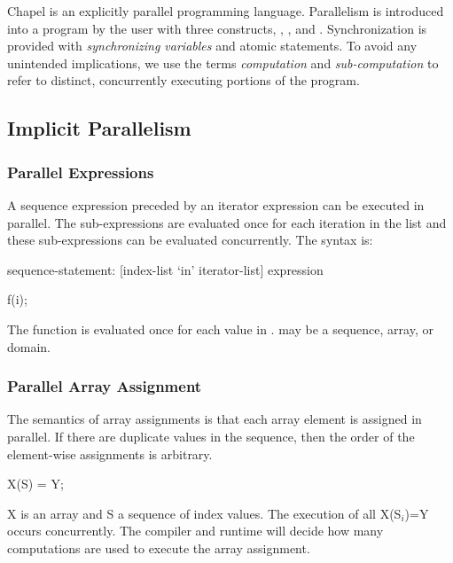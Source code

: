 \label{Parallelism_and_Synchronization}

Chapel is an explicitly parallel programming language. Parallelism is
introduced into a program by the user with three constructs,
, , and .  Synchronization is
provided with \emph{synchronizing variables} and atomic statements. To
avoid any unintended implications, we use the terms \emph{computation}
and \emph{sub-computation} to refer to distinct, concurrently
executing portions of the program.


\subsection{Implicit Parallelism}
\label{Implicit_Parallelism}


\subsubsection{Parallel Expressions}
\label{Parallel_Expressions}

A sequence expression preceded by an iterator expression can be
executed in parallel. The sub-expressions are evaluated once for each
iteration in the list and these sub-expressions can be evaluated
concurrently. The syntax is:
\begin{syntax}
sequence-statement:
   [index-list `in' iterator-list] expression
\end{syntax}

\begin{example}
\begin{chapel}
[i in S] f(i);
\end{chapel}
The function  is evaluated once for each value in . 
may be a sequence, array, or domain.
\end{example}

\subsubsection{Parallel Array Assignment}
\label{Parallel_Array_Assignment}

The semantics of array assignments is that each array element is
assigned in parallel. If there are duplicate values in the sequence,
then the order of the element-wise assignments is arbitrary.

\begin{example}
\begin{chapel}
X(S) = Y;
\end{chapel}
X is an array and S a sequence of index values. The execution of all X(S$_i$)=Y
occurs concurrently. The compiler and runtime will decide how many computations
are used to execute the array assignment.
\end{example}


